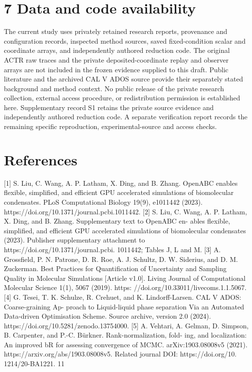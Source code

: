 \documentclass[11pt]{article}
\begin{document}
\section*{7 Data and code availability}

The current study uses privately retained research reports, provenance and configuration records,
inspected method sources, saved fixed-condition scalar and coordinate arrays, and independently
authored reduction code. The original ACTR raw traces and the private deposited-coordinate
replay and observer arrays are not included in the frozen evidence supplied to this draft. Public
literature and the archived CAL V ADOS source provide their separately stated background and
method context. No public release of the private research collection, external access procedure, or
redistribution permission is established here. Supplementary record S1 retains the private source
evidence and independently authored reduction code. A separate verification report records the
remaining specific reproduction, experimental-source and access checks.

\section*{References}

[1] S. Liu, C. Wang, A. P. Latham, X. Ding, and B. Zhang. OpenABC enables flexible, simplified,
and efficient GPU accelerated simulations of biomolecular condensates. PLoS Computational
Biology 19(9), e1011442 (2023). https://doi.org/10.1371/journal.pcbi.1011442.
[2] S. Liu, C. Wang, A. P. Latham, X. Ding, and B. Zhang. Supplementary text to OpenABC en-
ables flexible, simplified, and efficient GPU accelerated simulations of biomolecular condensates
(2023). Publisher supplementary attachment to https://doi.org/10.1371/journal.pcbi.
1011442; Tables J, L and M.
[3] A. Grossfield, P. N. Patrone, D. R. Roe, A. J. Schultz, D. W. Siderius, and D. M. Zuckerman.
Best Practices for Quantification of Uncertainty and Sampling Quality in Molecular Simulations
[Article v1.0]. Living Journal of Computational Molecular Science 1(1), 5067 (2019). https:
//doi.org/10.33011/livecoms.1.1.5067.
[4] G. Tesei, T. K. Schulze, R. Crehuet, and K. Lindorff-Larsen. CAL V ADOS: Coarse-graining Ap-
proach to Liquid-liquid phase separation Via an Automated Data-driven Optimisation Scheme.
Source archive, version 2.0 (2024). https://doi.org/10.5281/zenodo.13754000.
[5] A. Vehtari, A. Gelman, D. Simpson, B. Carpenter, and P.-C. Bürkner. Rank-normalization, fold-
ing, and localization: An improved bR for assessing convergence of MCMC. arXiv:1903.08008v5
(2021). https://arxiv.org/abs/1903.08008v5. Related journal DOI: https://doi.org/10.
1214/20-BA1221.
11
\end{document}
